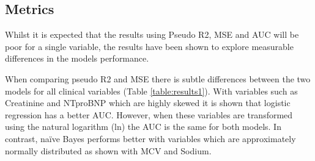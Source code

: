 \documentclass[a4paper,UKenglish]{oasics-v2016}
\begin{document}
\subsection*{Metrics}
Whilst it is expected that the results using Pseudo R2, MSE and AUC will be poor for a single variable, the results have been shown to explore measurable differences in the models performance.

When comparing pseudo R2 and MSE there is subtle differences between the two models for all clinical variables (Table \ref{table:results1}). With variables such as Creatinine and NTproBNP which are highly skewed it is shown that logistic regression has a better AUC. However, when these variables are transformed using the natural logarithm (ln) the AUC is the same for both models. In contrast, naïve Bayes performs better with variables which are approximately normally distributed as shown with MCV and Sodium.
\end{document}
